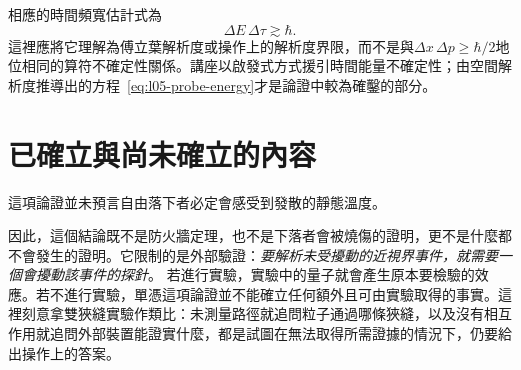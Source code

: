 \begin{classroomqa}
\end{classroomqa}

\begin{classroomqa}
\end{classroomqa}

\begin{classroomqa}
\end{classroomqa}

相應的時間頻寬估計式為
\begin{equation}
\Delta E\,\Delta\tau\gtrsim\hbar.
\end{equation}
這裡應將它理解為傅立葉解析度或操作上的解析度界限，而不是與\(\Delta x\,\Delta p\geq\hbar/2\)地位相同的算符不確定性關係。講座以啟發式方式援引時間能量不確定性；由空間解析度推導出的方程~\eqref{eq:l05-probe-energy}才是論證中較為確鑿的部分。

\begin{classroomqa}
\end{classroomqa}

\enlargethispage{2\baselineskip}
\section{已確立與尚未確立的內容}

這項論證並未預言自由落下者必定會感受到發散的靜態溫度。

\begin{classroomqa}
\end{classroomqa}

因此，這個結論既不是防火牆定理，也不是下落者會被燒傷的證明，更不是什麼都不會發生的證明。它限制的是外部驗證：\emph{要解析未受擾動的近視界事件，就需要一個會擾動該事件的探針}。
若進行實驗，實驗中的量子就會產生原本要檢驗的效應。若不進行實驗，單憑這項論證並不能確立任何額外且可由實驗取得的事實。這裡刻意拿雙狹縫實驗作類比：未測量路徑就追問粒子通過哪條狹縫，以及沒有相互作用就追問外部裝置能證實什麼，都是試圖在無法取得所需證據的情況下，仍要給出操作上的答案。